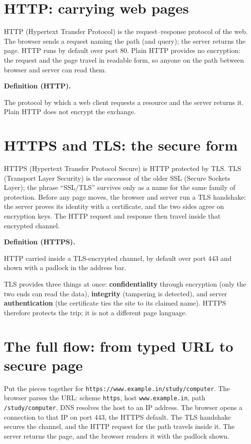 \documentclass[11pt]{article}
\newenvironment{definitionbox}[1]{%
  \par\noindent\textbf{Definition (#1).}\ \itshape
}{\par\vspace{0.3em}}
\begin{document}
\section{HTTP: carrying web pages}
HTTP (Hypertext Transfer Protocol) is the request--response protocol of the
web. The browser sends a request naming the path (and query); the server
returns the page. HTTP runs by default over port 80. Plain HTTP provides no
encryption: the request and the page travel in readable form, so anyone on
the path between browser and server can read them.

\begin{definitionbox}{HTTP}
The protocol by which a web client requests a resource and the server
returns it. Plain HTTP does not encrypt the exchange.
\end{definitionbox}

\section{HTTPS and TLS: the secure form}
HTTPS (Hypertext Transfer Protocol Secure) is HTTP protected by TLS. TLS
(Transport Layer Security) is the successor of the older SSL (Secure
Sockets Layer); the phrase ``SSL/TLS'' survives only as a name for the same
family of protection. Before any page moves, the browser and server run a
TLS handshake: the server proves its identity with a certificate, and the
two sides agree on encryption keys. The HTTP request and response then
travel inside that encrypted channel.

\begin{definitionbox}{HTTPS}
HTTP carried inside a TLS-encrypted channel, by default over port 443 and
shown with a padlock in the address bar.
\end{definitionbox}

TLS provides three things at once: \textbf{confidentiality} through
encryption (only the two ends can read the data), \textbf{integrity}
(tampering is detected), and server \textbf{authentication} (the certificate
ties the site to its claimed name). HTTPS therefore protects the trip; it
is not a different page language.

\section{The full flow: from typed URL to secure page}
Put the pieces together for \texttt{https://www.example.in/study/computer}.
The browser parses the URL: scheme \texttt{https}, host
\texttt{www.example.in}, path \texttt{/study/computer}. DNS resolves the
host to an IP address. The browser opens a connection to that IP on port
443, the HTTPS default. The TLS handshake secures the channel, and the HTTP
request for the path travels inside it. The server returns the page, and the
browser renders it with the padlock shown.
\end{document}
